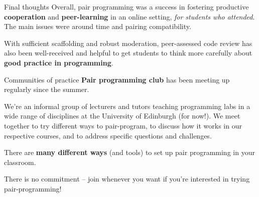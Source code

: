 \documentclass[aspectratio=169, 12pt]{beamer}
\begin{document}
\begin{frame}{Final thoughts}
    Overall, pair programming was a success in fostering productive \textbf{cooperation} and \textbf{peer-learning} in an online setting, \textit{for students who attended}. The main issues were around time and pairing compatibility.
    \pause

    With sufficient scaffolding and robust moderation, peer-assessed code review has also been well-received and helpful to get students to think more carefully about \textbf{good practice in programming}.
\end{frame}

\begin{frame}{Communities of practice}
    \textbf{Pair programming club} has been meeting up regularly since the summer.

    We're an informal group of lecturers and tutors teaching programming labs in a wide range of disciplines at the University of Edinburgh (for now!). We meet together to try different ways to pair-program, to discuss how it works in our respective courses, and to address specific questions and challenges.

    There are \textbf{many different ways} (and tools) to set up pair programming in your classroom.

    There is no commitment -- join whenever you want if you're interested in trying pair-programming!
\end{frame}
\end{document}

